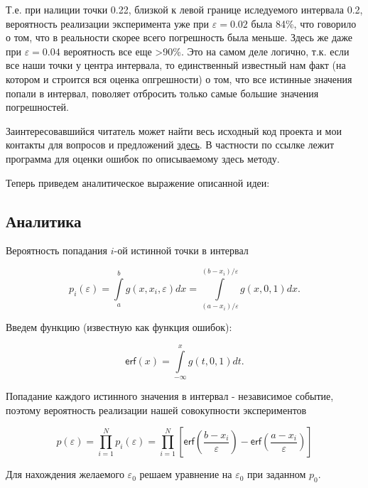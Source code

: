 \documentclass[a4paper,12pt]{article} %
\begin{document}
Т.е. при налиции точки 0.22, близкой к левой границе иследуемого интервала 0.2, вероятность реализации эксперимента уже при $\varepsilon = 0.02$ была 84\%, что говорило о том, что в реальности скорее всего погрешность была меньше. Здесь же даже при $\varepsilon = 0.04$ вероятность все еще >90\%. Это на самом деле логично, т.к. если все наши точки у центра интервала, то единственный известный нам факт (на котором и строится вся оценка опгрешности) о том, что все истинные значения попали в интервал, поволяет отбросить только самые большие значения погрешностей.

Заинтересовавшийся читатель может найти весь исходный код проекта и мои контакты для вопросов и предложений \href{https://github.com/PolyachenkoYA/errorEstimationIOGT}{здесь}. В частности по ссылке лежит программа для оценки ошибок по описываемому здесь методу.

Теперь приведем аналитическое выражение описанной идеи:

\newpage

\subsection{Аналитика}

Вероятность попадания $i$-ой истинной точки в интервал

\begin{equation}
p_i(\varepsilon) = \int\limits_a^b g \left(x, x_i, \varepsilon \right) dx = \int\limits_{(a-x_i)/\varepsilon}^{(b-x_i)/\varepsilon} g(x, 0, 1) dx.
\end{equation}

Введем функцию (известную как функция ошибок):

\begin{equation}
\textsf{erf}(x) = \int\limits_{- \infty}^x g(t, 0, 1) dt.
\end{equation}

Попадание каждого истинного значения в интервал - независимое событие, поэтому вероятность реализации нашей совокупности экспериментов

\begin{equation}
p(\varepsilon) = \prod_{i = 1}^N p_i(\varepsilon) = \prod_{i = 1}^N \left[ \textsf{erf} \left( \dfrac{b - x_i}{\varepsilon} \right) - \textsf{erf} \left( \dfrac{a - x_i}{\varepsilon} \right) \right]
\end{equation}

Для нахождения желаемого $\varepsilon_0$ решаем уравнение на $\varepsilon_0$ при заданном $p_0$.
\end{document}
